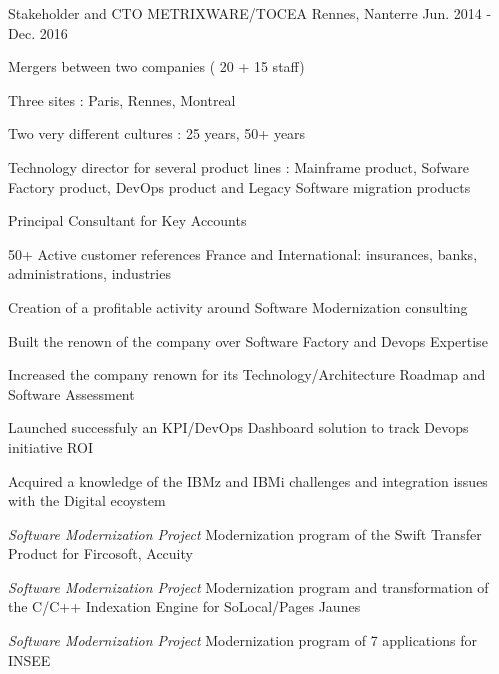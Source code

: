 \begin{cventries}
    \cventry
    {Stakeholder and CTO} %
    {METRIXWARE/TOCEA} %
    {Rennes, Nanterre} %
    {Jun. 2014 - Dec. 2016} %
    {
        \experience
        {
            \begin{cvitems} %
                \item{Mergers between two companies ( 20 + 15 staff)}
                \item{Three sites : Paris, Rennes, Montreal}
                \item{Two very different cultures : 25 years, 50+ years}
                \item{Technology director for several product lines : Mainframe product, Sofware Factory product, DevOps product and Legacy Software migration products}
                \item{Principal Consultant for Key Accounts}
                \item{50+ Active customer references France and International: insurances, banks, administrations, industries}
            \end{cvitems}
        }
        {
           \begin{cvitems} %
            \item{ Creation of a profitable activity around Software Modernization consulting}
            \item{ Built the renown of the company over Software Factory and Devops Expertise}
            \item{ Increased the company renown for its Technology/Architecture Roadmap and Software Assessment}
            \item{ Launched successfuly an KPI/DevOps Dashboard solution to track Devops initiative ROI}              
            \item{ Acquired a knowledge of the IBMz and IBMi challenges and integration issues with the Digital ecoystem}
            \item{\emph{Software Modernization Project} Modernization program of the Swift Transfer Product for Fircosoft, Accuity}
            \item{\emph{Software Modernization Project} Modernization program and transformation of the C/C++ Indexation Engine for SoLocal/Pages Jaunes}
            \item{\emph{Software Modernization Project} Modernization program of 7 applications for INSEE}

\end{cvitems}}}
\end{cventries}
